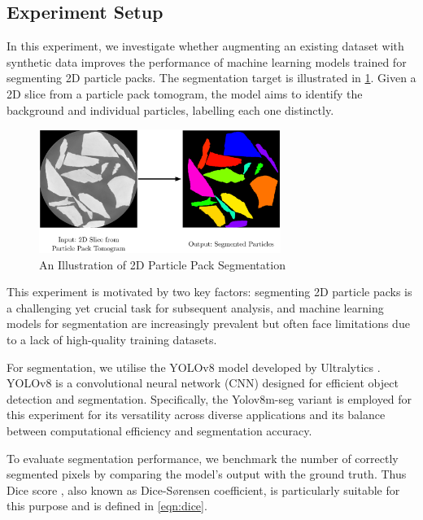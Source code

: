 \documentclass[preprint,12pt]{elsarticle}
\begin{document}
\subsection{Experiment Setup}
In this experiment, we investigate whether augmenting an existing dataset with synthetic data improves the performance of machine learning models trained for segmenting 2D particle packs. 
The segmentation target is illustrated in \cref{fig:syn:seg_target}. Given a 2D slice from a particle pack tomogram, the model aims to identify the background and individual particles, labelling each one distinctly.
\begin{figure}[H]
    \centering
    \includegraphics[width=0.7\textwidth]{figures/img/segmentation-intro.eps}
    \caption{An Illustration of 2D Particle Pack Segmentation}
    \label{fig:syn:seg_target}
\end{figure}
This experiment is motivated by two key factors: segmenting 2D particle packs is a challenging yet crucial task for subsequent analysis, and machine learning models for segmentation are increasingly prevalent but often face limitations due to a lack of high-quality training datasets.
\par
For segmentation, we utilise the YOLOv8 model developed by Ultralytics \citep{jocher2023yolo}.
YOLOv8 is a convolutional neural network (CNN) designed for efficient object detection and segmentation.
Specifically, the Yolov8m-seg variant is employed for this experiment for its versatility across diverse applications and its balance between computational efficiency and segmentation accuracy.
\par
To evaluate segmentation performance, we benchmark the number of correctly segmented pixels by comparing the model's output with the ground truth.
Thus Dice score \cite{Dice1945MeasuresOT}, also known as Dice-Sørensen coefficient, is particularly suitable for this purpose and is defined in \cref{eqn:dice}.
\end{document}
